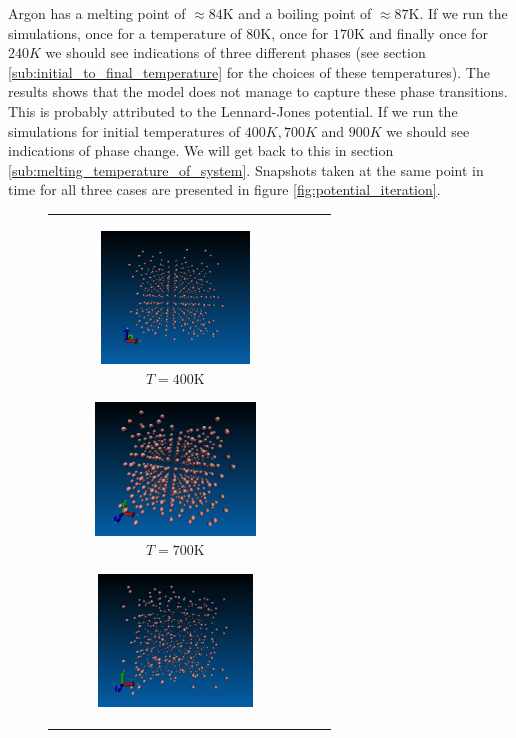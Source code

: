 \documentclass[a4paper]{article}
\begin{document}
    Argon has a melting point of $\approx 84$K and a boiling point of $\approx
    87$K. If we run the simulations, once for a temperature of $80$K, once for
    $170$K and finally once for $240K$ we should see indications of three
    different phases (see section \ref{sub:initial_to_final_temperature} for
    the choices of these temperatures). The results shows that the model does
    not manage to capture these phase transitions. This is probably attributed
    to the Lennard-Jones potential. If we run the simulations for initial
    temperatures of $400K, 700K$ and $900K$ we should see indications of phase
    change. We will get back to this in section
    \ref{sub:melting_temperature_of_system}. Snapshots taken at the same point
    in time for all three cases are presented in figure
    \ref{fig:potential_iteration}.
    \begin{figure}
        \begin{tabular}[c]{ccc}
            \begin{subfigure}[c]{0.32\textwidth}
                \includegraphics[height=100pt, width=\linewidth]{solid_40K.png}
                \caption{$T = 400$K}
            \end{subfigure}
            \begin{subfigure}[c]{0.32\textwidth}
                \includegraphics[height=100pt, width=\linewidth]{liquid_85K.png}
                \caption{$T = 700$K}
            \end{subfigure}
            \begin{subfigure}[c]{0.32\textwidth}
                \includegraphics[height=100pt, width=\linewidth]{gas_120K.png}

\end{subfigure}
\end{tabular}
\end{figure}
\end{document}
